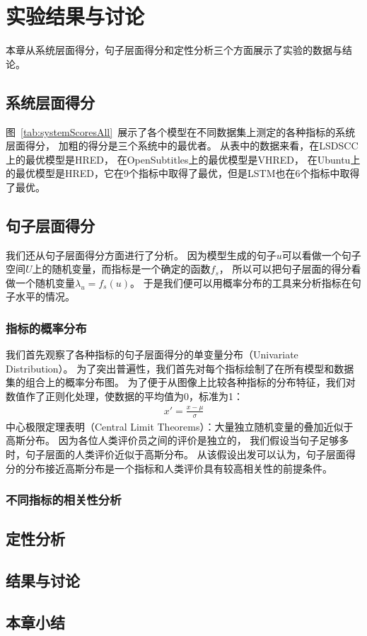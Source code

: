 
\chapter{实验结果与讨论}\label{ch:experiment}
本章从系统层面得分，句子层面得分和定性分析三个方面展示了实验的数据与结论。

\section{系统层面得分}\label{sec:system_scores}
图~\ref{tab:systemScoresAll}~展示了各个模型在不同数据集上测定的各种指标的系统层面得分，
加粗的得分是三个系统中的最优者。
从表中的数据来看，在LSDSCC上的最优模型是HRED，
在OpenSubtitles上的最优模型是VHRED，
在Ubuntu上的最优模型是HRED，它在9个指标中取得了最优，但是LSTM也在6个指标中取得了最优。



\section{句子层面得分}\label{sec:utterance_scores}
我们还从句子层面得分方面进行了分析。
因为模型生成的句子$u$可以看做一个句子空间$U$上的随机变量，而指标是一个确定的函数$f_{s}$，
所以可以把句子层面的得分看做一个随机变量$\lambda_u = f_{s}(u)$。
于是我们便可以用概率分布的工具来分析指标在句子水平的情况。

\subsection{指标的概率分布}\label{subsec:metric_distribution}
我们首先观察了各种指标的句子层面得分的单变量分布（Univariate Distribution）。
为了突出普遍性，我们首先对每个指标绘制了在所有模型和数据集的组合上的概率分布图。
为了便于从图像上比较各种指标的分布特征，我们对数值作了正则化处理，使数据的平均值为0，标准为1：
\begin{align}
    x' = \frac{x - \mu}{\sigma}
\end{align}
中心极限定理表明（Central Limit Theorems）：大量独立随机变量的叠加近似于高斯分布。
因为各位人类评价员之间的评价是独立的， 我们假设当句子足够多时，句子层面的人类评价近似于高斯分布。
从该假设出发可以认为，句子层面得分的分布接近高斯分布是一个指标和人类评价具有较高相关性的前提条件。






\subsection{不同指标的相关性分析}\label{subsec:metric_correlation}

\section{定性分析}\label{sec:qualitative_analysis}

\section{结果与讨论}\label{sec:result_and_discussion}

\section{本章小结}\label{sec:experiment_conclusion}
